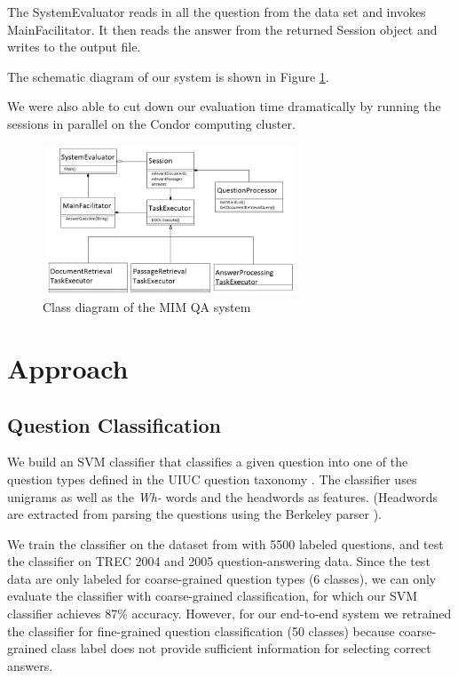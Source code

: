 \documentclass[11pt]{article}
\begin{document}
The SystemEvaluator reads in all the question from the data set and invokes MainFacilitator. It then reads the answer from the returned Session object and writes to the output file.

The schematic diagram of our system is shown in Figure \ref{classdiagram}.

We were also able to cut down our evaluation time dramatically by running the sessions in parallel on the Condor computing cluster. 



\begin{figure}[h]
\includegraphics[width=3in,height=1.75in]{MIM_class_diagram.png}

\caption{\label{classdiagram}Class diagram of the MIM QA system}
\end{figure}


\section{Approach}
\subsection{Question Classification}
We build an SVM classifier that classifies a given question into one of the question types defined in the UIUC question taxonomy \cite{li2002learning}. The classifier uses unigrams as well as the {\it Wh-} words and the headwords as features. (Headwords are extracted from parsing the questions using the Berkeley parser \cite{berkeleyparser}).

We train the classifier on the dataset from \cite{uiuc} with 5500 labeled questions, and test the classifier on TREC 2004 and 2005 question-answering data. Since the test data are only labeled for coarse-grained question types (6 classes), we can only evaluate the classifier with coarse-grained classification, for which our SVM classifier achieves 87\% accuracy. However, for our end-to-end system we retrained the classifier for fine-grained question classification (50 classes) because coarse-grained class label does not provide sufficient information for selecting correct answers.
\end{document}
